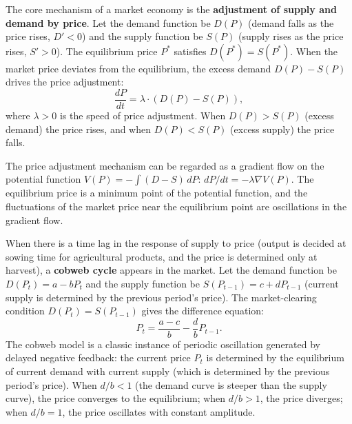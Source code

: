\begin{definition}\label{def:supply_demand}
The core mechanism of a market economy is the \textbf{adjustment of supply and demand by price}. Let the demand function be $D(P)$ (demand falls as the price rises, $D' < 0$) and the supply function be $S(P)$ (supply rises as the price rises, $S' > 0$). The equilibrium price $P^*$ satisfies $D(P^*) = S(P^*)$. When the market price deviates from the equilibrium, the excess demand $D(P) - S(P)$ drives the price adjustment:
\[
\frac{dP}{dt} = \lambda \cdot (D(P) - S(P)),
\]
where $\lambda > 0$ is the speed of price adjustment. When $D(P) > S(P)$ (excess demand) the price rises, and when $D(P) < S(P)$ (excess supply) the price falls.

The price adjustment mechanism can be regarded as a gradient flow on the potential function $V(P) = -\int (D - S)\,dP$: $dP/dt = -\lambda \nabla V(P)$. The equilibrium price is a minimum point of the potential function, and the fluctuations of the market price near the equilibrium point are oscillations in the gradient flow.
\end{definition}

\begin{definition}\label{def:cobweb_model}
When there is a time lag in the response of supply to price (output is decided at sowing time for agricultural products, and the price is determined only at harvest), a \textbf{cobweb cycle} appears in the market. Let the demand function be $D(P_t) = a - bP_t$ and the supply function be $S(P_{t-1}) = c + dP_{t-1}$ (current supply is determined by the previous period's price). The market-clearing condition $D(P_t) = S(P_{t-1})$ gives the difference equation:
\[
P_t = \frac{a-c}{b} - \frac{d}{b} P_{t-1}.
\]
The cobweb model is a classic instance of periodic oscillation generated by delayed negative feedback: the current price $P_t$ is determined by the equilibrium of current demand with current supply (which is determined by the previous period's price). When $d/b < 1$ (the demand curve is steeper than the supply curve), the price converges to the equilibrium; when $d/b > 1$, the price diverges; when $d/b = 1$, the price oscillates with constant amplitude.
\end{definition}


